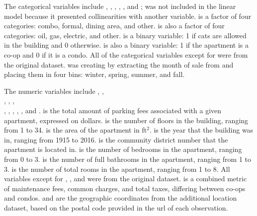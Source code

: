 \documentclass[12pt]{article}
\begin{document}
The categorical variables include , , , , , and ;  was not included in the linear model because it presented collinearities with another variable.  is a factor of four categories: combo, formal, dining area, and other.  is also a factor of four categories: oil, gas, electric, and other.  is a binary variable: 1 if cats are allowed in the building and 0 otherwise.  is also a binary variable: 1 if the apartment is a co-op and 0 if it is a condo. All of the categorical variables except for  were from the original dataset.  was creating by extracting the month of sale from  and placing them in four bins: winter, spring, summer, and fall.

The numeric variables include , , \\ , , , \\ , , 
, ,
, and . 
 is the total amount of parking fees associated with a given apartment, expressed on dollars.  is the number of floors in the building, ranging from 1 to 34.  is the area of the apartment in ft$^2$.  is the year that the building was in, ranging from 1915 to 2016.  is the community district number that the apartment is located in.  is the number of bedrooms in the apartment, ranging from 0 to 3.  is the number of full bathrooms in the apartment, ranging from 1 to 3.  is the number of total rooms in the apartment, ranging from 1 to 8. All variables except for ,
, and  were from the original dataset.  is a combined metric of maintenance fees, common charges, and total taxes, differing between co-ops and condos.  and  are the geographic coordinates from the additional location dataset, based on the postal code provided in the url of each observation.
\end{document}
